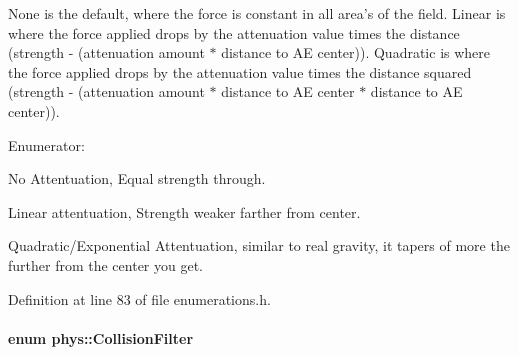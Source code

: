 None is the default, where the force is constant in all area's of the field. Linear is where the force applied drops by the attenuation value times the distance (strength -\/ (attenuation amount $\ast$ distance to AE center)). Quadratic is where the force applied drops by the attenuation value times the distance squared (strength -\/ (attenuation amount $\ast$ distance to AE center $\ast$ distance to AE center)). \begin{Desc}
\item[Enumerator: ]\par
\begin{description}
\item[{\em 
\hypertarget{namespacephys_ad4ce7ee5c1cc164f2ea3d5f28211739faec47e7157a10201b7aef0c1cbb6ccb5d}{
Att\_\-None}
\label{namespacephys_ad4ce7ee5c1cc164f2ea3d5f28211739faec47e7157a10201b7aef0c1cbb6ccb5d}
}]No Attentuation, Equal strength through. \item[{\em 
\hypertarget{namespacephys_ad4ce7ee5c1cc164f2ea3d5f28211739fabcceb16182220293f2260edb41b548f1}{
Att\_\-Linear}
\label{namespacephys_ad4ce7ee5c1cc164f2ea3d5f28211739fabcceb16182220293f2260edb41b548f1}
}]Linear attentuation, Strength weaker farther from center. \item[{\em 
\hypertarget{namespacephys_ad4ce7ee5c1cc164f2ea3d5f28211739fac9ef08c39daa338975f4f8879e86100b}{
Att\_\-Quadratic}
\label{namespacephys_ad4ce7ee5c1cc164f2ea3d5f28211739fac9ef08c39daa338975f4f8879e86100b}
}]Quadratic/Exponential Attentuation, similar to real gravity, it tapers of more the further from the center you get. \end{description}
\end{Desc}



Definition at line 83 of file enumerations.h.

\hypertarget{namespacephys_aa69523df12b54123e76c40734556ca35}{
\paragraph[{CollisionFilter}]{\setlength{\rightskip}{0pt plus 5cm}enum {\bf phys::CollisionFilter}}\hfill}
\label{namespacephys_aa69523df12b54123e76c40734556ca35}


